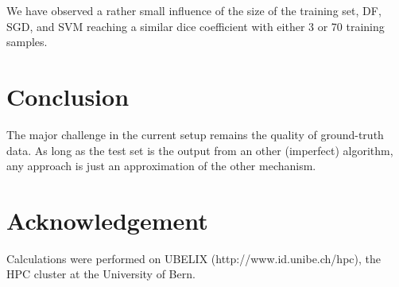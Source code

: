 \documentclass[journal]{IEEEtran}
\begin{document}
We have observed a rather small influence of the size of the training set, DF, SGD, and SVM reaching a similar dice coefficient with either 3 or 70 training samples.


\section{Conclusion}
The major challenge in the current setup remains the quality of ground-truth data. As long as the test set is the output from an other (imperfect) algorithm, any approach is just an approximation of the other mechanism.

\section*{Acknowledgement}
Calculations were performed on UBELIX (http://www.id.unibe.ch/hpc), the HPC cluster at the University of Bern.



\end{document}
